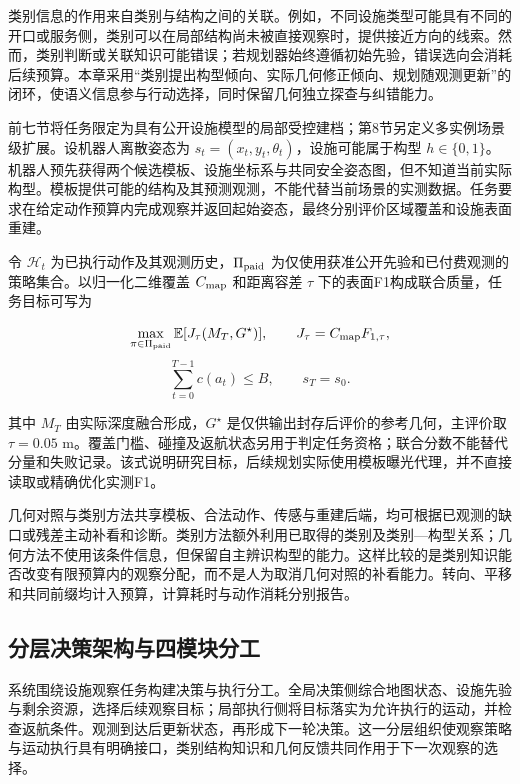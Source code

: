 \documentclass[11pt,a4paper]{article}
\numberwithin{equation}{section}
\begin{document}
类别信息的作用来自类别与结构之间的关联。例如，不同设施类型可能具有不同的开口或服务侧，类别可以在局部结构尚未被直接观察时，提供接近方向的线索。然而，类别判断或关联知识可能错误；若规划器始终遵循初始先验，错误选向会消耗后续预算。本章采用``类别提出构型倾向、实际几何修正倾向、规划随观测更新''的闭环，使语义信息参与行动选择，同时保留几何独立探查与纠错能力。

前七节将任务限定为具有公开设施模型的局部受控建档；第8节另定义多实例场景级扩展。设机器人离散姿态为 \(s_t=(x_t,y_t,\theta_t)\)，设施可能属于构型 \(h\in\{0,1\}\)。机器人预先获得两个候选模板、设施坐标系与共同安全姿态图，但不知道当前实际构型。模板提供可能的结构及其预测观测，不能代替当前场景的实测数据。任务要求在给定动作预算内完成观察并返回起始姿态，最终分别评价区域覆盖和设施表面重建。

令 \(\mathcal H_t\) 为已执行动作及其观测历史，\(\Pi_{\rm paid}\) 为仅使用获准公开先验和已付费观测的策略集合。以归一化二维覆盖 \(C_{\rm map}\) 和距离容差 \(\tau\) 下的表面F1构成联合质量，任务目标可写为

\begin{equation}
\max_{\pi\in\Pi_{\rm paid}}\mathbb E[J_\tau(M_T,G^\star)],
\qquad J_\tau=C_{\rm map}F_{1,\tau},
\end{equation} \begin{equation}
\sum_{t=0}^{T-1}c(a_t)\le B,\qquad s_T=s_0.
\end{equation}

其中 \(M_T\) 由实际深度融合形成，\(G^\star\) 是仅供输出封存后评价的参考几何，主评价取 \(\tau=0.05\) m。覆盖门槛、碰撞及返航状态另用于判定任务资格；联合分数不能替代分量和失败记录。该式说明研究目标，后续规划实际使用模板曝光代理，并不直接读取或精确优化实测F1。

几何对照与类别方法共享模板、合法动作、传感与重建后端，均可根据已观测的缺口或残差主动补看和诊断。类别方法额外利用已取得的类别及类别---构型关系；几何方法不使用该条件信息，但保留自主辨识构型的能力。这样比较的是类别知识能否改变有限预算内的观察分配，而不是人为取消几何对照的补看能力。转向、平移和共同前缀均计入预算，计算耗时与动作消耗分别报告。

\hypertarget{ux5206ux5c42ux51b3ux7b56ux67b6ux6784ux4e0eux56dbux6a21ux5757ux5206ux5de5}{%
\subsection{分层决策架构与四模块分工}\label{ux5206ux5c42ux51b3ux7b56ux67b6ux6784ux4e0eux56dbux6a21ux5757ux5206ux5de5}}

系统围绕设施观察任务构建决策与执行分工。全局决策侧综合地图状态、设施先验与剩余资源，选择后续观察目标；局部执行侧将目标落实为允许执行的运动，并检查返航条件。观测到达后更新状态，再形成下一轮决策。这一分层组织使观察策略与运动执行具有明确接口，类别结构知识和几何反馈共同作用于下一次观察的选择。
\end{document}
